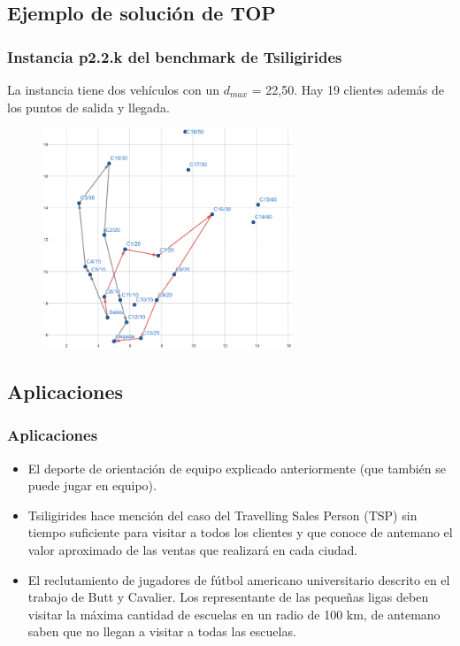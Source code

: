 \documentclass{beamer}
\begin{document}
\subsection{Ejemplo de solución de TOP}

\begin{frame}
\frametitle{Instancia p2.2.k del benchmark de Tsiligirides}

La instancia tiene dos vehículos con un $d_{max}$ = 22,50. Hay 19 clientes además de los puntos de salida y llegada.%

\begin{figure}[h]
	\centering
	\includegraphics[width=7.5cm]{400cropped}
	\label{fig:400cropped}
\end{figure}


\end{frame}


\subsection{Aplicaciones}

\begin{frame}
\frametitle{Aplicaciones}

\begin{itemize}
	\item El deporte de orientación de equipo explicado anteriormente (que también se puede jugar en equipo).
	\pause
	\item Tsiligirides hace mención del caso del Travelling Sales Person (TSP) sin tiempo suficiente para visitar a todos los clientes y que conoce de antemano el valor aproximado de las ventas que realizará en cada ciudad.
	\pause
	\item El reclutamiento de jugadores de fútbol americano universitario descrito en el trabajo de Butt y Cavalier. Los representante de las pequeñas ligas deben visitar la máxima cantidad de escuelas en un radio de 100 km, de antemano saben que no llegan a visitar a todas las escuelas.
\end{itemize}

\end{frame}
\end{document}
